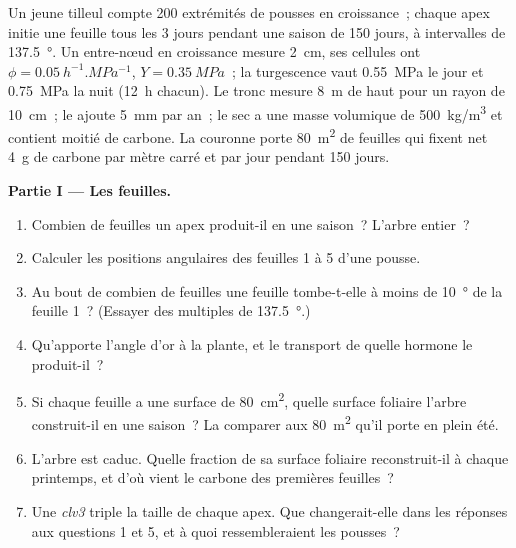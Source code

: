 \begin{problem}
\label{pb:b2:plant-meristems:1}
Un jeune tilleul compte \num{200} extrémités de pousses en croissance~;
chaque apex initie une feuille tous les \num{3} jours pendant une saison
de \num{150} jours, à intervalles de \qty{137.5}{\degree}. Un
entre-nœud en croissance mesure \qty{2}{cm}, ses cellules ont
$\phi = \qty{0.05}{h^{-1}.MPa^{-1}}$, $Y =
\qty{0.35}{MPa}$~; la turgescence vaut \qty{0.55}{MPa} le jour et
\qty{0.75}{MPa} la nuit (\qty{12}{h} chacun). Le tronc mesure
\qty{8}{m} de haut pour un rayon de \qty{10}{cm}~; le  ajoute
\qty{5}{mm} par an~; le  sec a une masse volumique de
\qty{500}{kg/m^3} et contient moitié de carbone. La couronne porte
\qty{80}{m^2} de feuilles qui fixent net \qty{4}{g} de carbone par mètre
carré et par jour pendant \num{150} jours.

\medskip
\noindent\textbf{Partie I --- Les feuilles.}
\begin{enumerate}
  \item Combien de feuilles un apex produit-il en une saison~? L'arbre
        entier~?
  \item Calculer les positions angulaires des feuilles 1 à 5 d'une
        pousse.
  \item Au bout de combien de feuilles une feuille tombe-t-elle à moins
        de \qty{10}{\degree} de la feuille 1~? (Essayer des multiples de
        \qty{137.5}{\degree}.)
  \item Qu'apporte l'angle d'or à la plante, et le transport de quelle
        hormone le produit-il~?
  \item Si chaque feuille a une surface de \qty{80}{cm^2}, quelle surface
        foliaire l'arbre construit-il en une saison~? La comparer aux
        \qty{80}{m^2} qu'il porte en plein été.
  \item L'arbre est caduc. Quelle fraction de sa surface foliaire
        reconstruit-il à chaque printemps, et d'où vient le carbone des
        premières feuilles~?
  \item Une  \emph{clv3} triple la taille de chaque apex. Que
        changerait-elle dans les réponses aux questions 1 et 5, et à quoi
        ressembleraient les pousses~?
\end{enumerate}


\end{problem}
